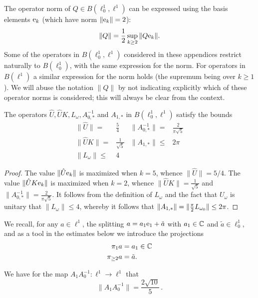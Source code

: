 The operator norm of  $Q \in B(\ell^1_0,\ell^1)$ can be expressed using the basis elements $\mathrm{e}_k$ (which have norm $\|\mathrm{e}_k\|=2$):
\begin{equation}\label{e:operatornorm}
  \| Q \| = \frac{1}{2} \sup_{k \geq 2} \|Q \mathrm{e}_k\| .
\end{equation}
Some of the operators in $B(\ell^1_0,\ell^1)$ considered in these appendices restrict naturally to $B(\ell^1_0)$, with the same expression for the norm. For operators in $B(\ell^1)$ a similar expression for the norm holds (the supremum being over $k\geq 1$). We will abuse the notation $\|Q\|$ by not indicating explicitly which of these operator norms is considered; this will always be clear from the context.
\begin{proposition}\label{p:severalnorms}
	The operators $\hat{U}, \hat{U} K, L_{\omega}, A_{0,*}^{-1}   $ and $A_{1,*}$ in $B(\ell^1_0,\ell^1)$  satisfy the bounds
\begin{align*}
\| \hat{U} \| 		=& \tfrac{5}{4} 						&\| A_{0,*}^{-1} \| =& \tfrac{2}{ \pi \sqrt{5}}	\\ 
\| \hat{U} K \| 	=& \tfrac{1}{ \sqrt{5}}	&\| A_{1,*} \| \leq& 2 \pi	 \\
\| L_{\omega} \| \leq& 4
\end{align*}
\end{proposition}
\begin{proof}
		The value $\| \hat{U} \mathrm{e}_k \|$ is maximized when $k=5$, whence  $\| \hat{U} \| = 5/4$. 
		The value $\| \hat{U} K \mathrm{e}_k \|$ is maximized when $k=2$, whence $\| \hat{U} K \| 	= \frac{1}{ \sqrt{5}}$ and $\| A_{0,*}^{-1}\| = \frac{2}{\pi \sqrt{5}} $. 
It follows from the definition of $L_\omega$ and the fact that $U_\omega$ is unitary that $ \| L_{\omega} \| \leq 4$, whereby it follows that  
$ \| A_{1,*} \| = \| \tfrac{\pi}{2} L_{\omega_0} \|  \leq 2 \pi$.
\end{proof}

We recall, for any $a\in \ell^1$, the splitting $a=a_1 \mathrm{e}_1 + \tilde{a}$ with $a_1 \in \mathbb{C}$ and $\tilde{a} \in \ell^1_0 $,  and as a tool in the estimates below we  introduce the projections 
\begin{alignat}{1}
	\pi_1 a &= a_1  \in \mathbb{C} \\
	\pi_{\geq 2} a & = \tilde{a}. \label{e:pige2}
\end{alignat}

\begin{proposition}
	\label{prop:A1A0}
	We have for the map $ A_1 A_0^{-1} : \ell^1 \to \ell^1$ that 
	\begin{equation}
	\label{eq:A1A0}	
	\| A_1 A_0^{-1}\| = \frac{2 \sqrt{10}}{5} \, .
	\end{equation}
\end{proposition}

